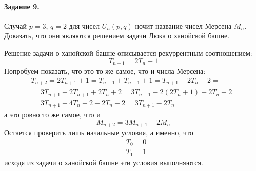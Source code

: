 \documentclass[a4paper,12pt]{article}
\begin{document}
\paragraph{Задание 9.} Случай $p=3$, $q=2$ для чисел $U_n\left(p,q\right)$ ночит название чисел Мерсена $M_n$. Доказать, что они являются решением задачи Люка о ханойской башне.

\begin{Solution}
Решение задачи о ханойской башне описывается рекуррентным соотношением:
\[
	T_{n+1} = 2 T_n + 1
\]
Попробуем показать, что это то же самое, что и числа Мерсена:
\[
	\begin{split}
		& T_{n+2} = 2 T_{n+1} + 1 = T_{n+1} + T_{n+1} + 1 = T_{n+1} + 2 T_n + 2 = \\
		& = 3 T_{n+1} - 2 T_{n+1} + 2 T_n + 2 = 3 T_{n+1} - 2 \left(2 T_n + 1\right) + 2 T_n + 2 = \\
		& = 3 T_{n+1} - 4 T_n - 2 + 2 T_n + 2 = 3 T_{n+1} - 2 T_n
	\end{split}
\]
а это ровно то же самое, что и
\[
	M_{n+2} = 3 M_{n+1} - 2 M_n
\]
Остается проверить лишь начальные условия, а именно, что
\[
	\begin{split}
		& T_0 = 0 \\
		& T_1 = 1
	\end{split}
\]
исходя из задачи о ханойской башне эти условия выполняются.
\end{Solution}
\end{document}
